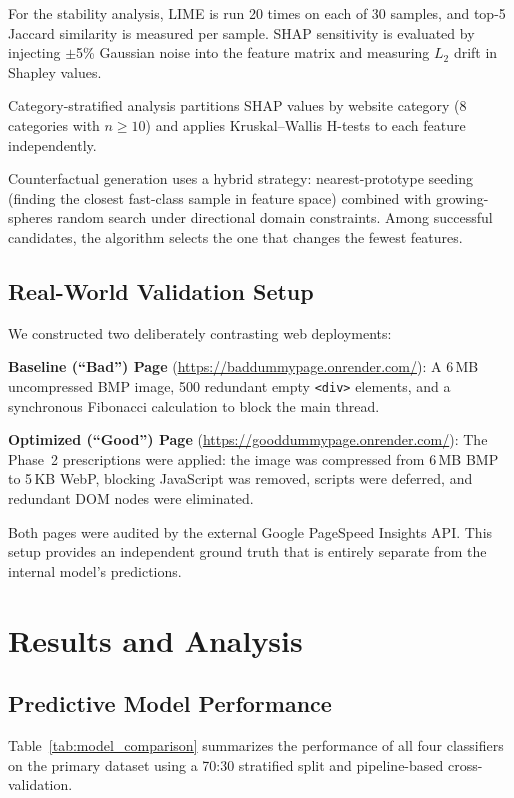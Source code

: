 \documentclass[sn-nature]{sn-jnl}
\begin{document}
For the stability analysis, LIME is run 20 times on each of 30 samples, and top-5 Jaccard similarity is measured per sample. SHAP sensitivity is evaluated by injecting $\pm$5\% Gaussian noise into the feature matrix and measuring $L_2$ drift in Shapley values.

Category-stratified analysis partitions SHAP values by website category (8 categories with $n \geq 10$) and applies Kruskal--Wallis H-tests to each feature independently.

Counterfactual generation uses a hybrid strategy: nearest-prototype seeding (finding the closest fast-class sample in feature space) combined with growing-spheres random search under directional domain constraints. Among successful candidates, the algorithm selects the one that changes the fewest features.

\subsection{Real-World Validation Setup}

We constructed two deliberately contrasting web deployments:

\textbf{Baseline (``Bad'') Page} (\url{https://baddummypage.onrender.com/}): A 6\,MB uncompressed BMP image, 500 redundant empty \texttt{<div>} elements, and a synchronous Fibonacci calculation to block the main thread.

\textbf{Optimized (``Good'') Page} (\url{https://gooddummypage.onrender.com/}): The Phase~2 prescriptions were applied: the image was compressed from 6\,MB BMP to 5\,KB WebP, blocking JavaScript was removed, scripts were deferred, and redundant DOM nodes were eliminated.

Both pages were audited by the external Google PageSpeed Insights API. This setup provides an independent ground truth that is entirely separate from the internal model's predictions.


\section{Results and Analysis}\label{sec6}

\subsection{Predictive Model Performance}

Table~\ref{tab:model_comparison} summarizes the performance of all four classifiers on the primary dataset using a 70:30 stratified split and pipeline-based cross-validation.
\end{document}
